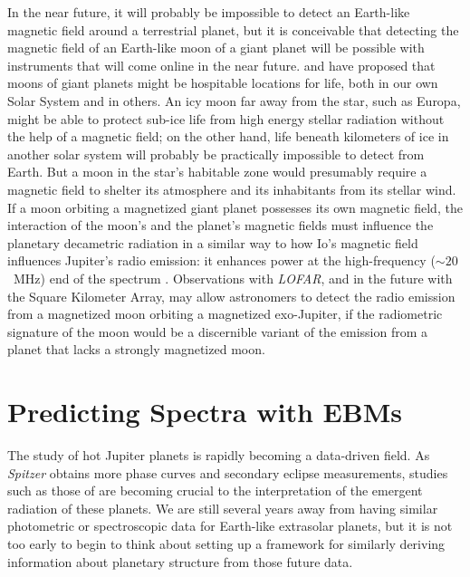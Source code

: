 In the near future, it will probably be impossible to detect an
Earth-like magnetic field around a terrestrial planet, but it is
conceivable that detecting the magnetic field of an Earth-like moon of
a giant planet will be possible with instruments that will come online
in the near future.  \citet{williams_et_al1997} and \citet{scharf2006}
have proposed that moons of giant planets might be hospitable
locations for life, both in our own Solar System and in others.  An
icy moon far away from the star, such as Europa, might be able to
protect sub-ice life from high energy stellar radiation without the
help of a magnetic field; on the other hand, life beneath kilometers
of ice in another solar system will probably be practically impossible
to detect from Earth.  But a moon in the star's habitable zone would
presumably require a magnetic field to shelter its atmosphere and its
inhabitants from its stellar wind.  If a moon orbiting a magnetized
giant planet possesses its own magnetic field, the interaction of the
moon's and the planet's magnetic fields must influence the planetary
decametric radiation in a similar way to how Io's magnetic field
influences Jupiter's radio emission: it enhances power at the
high-frequency ($\sim20$~MHz) end of the spectrum \citep{zarka1992}.
Observations with {\it LOFAR}, and in the future with the Square
Kilometer Array, may allow astronomers to detect the radio emission
from a magnetized moon orbiting a magnetized exo-Jupiter, if the
radiometric signature of the moon would be a discernible variant of
the emission from a planet that lacks a strongly magnetized moon.



\section{Predicting Spectra with EBMs}
\label{conc_sec:earth_spec}

The study of hot Jupiter planets is rapidly becoming a data-driven
field.  As {\it Spitzer} obtains more phase curves and secondary
eclipse measurements, studies such as those of
\citet{burrows_et_al2007b} are becoming crucial to the interpretation
of the emergent radiation of these planets.  We are still several
years away from having similar photometric or spectroscopic data for
Earth-like extrasolar planets, but it is not too early to begin to
think about setting up a framework for similarly deriving information
about planetary structure from those future data.

